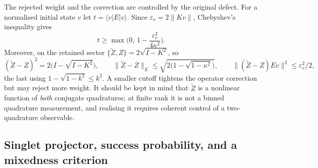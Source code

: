 \documentclass[11pt,a4paper]{article}
\newcommand{\ket}[1]{|#1\rangle}
\newcommand{\bra}[1]{\langle#1|}
\newcommand{\Zt}{\widetilde Z}
\begin{document}
The rejected weight and the correction are controlled by the original defect. For a normalised initial state $v$ let $t=\bra vE\ket v$. Since $\varepsilon_v=2\|Kv\|$, Chebyshev's inequality gives
\begin{equation}
t\ge\max\Big(0,\,1-\frac{\varepsilon_v^2}{4\kappa^2}\Big).
\label{eq:tbound}
\end{equation}
Moreover, on the retained sector $\{\Zt,Z\}=2\sqrt{I-K^2}$, so
\begin{equation}
(\Zt-Z)^2=2\big(I-\sqrt{I-K^2}\big),\qquad
\|\Zt-Z\|_{E}\le\sqrt{2\big(1-\sqrt{1-\kappa^2}\big)},\qquad
\|(\Zt-Z)Ev\|^2\le\varepsilon_v^2/2,
\label{eq:corrbound}
\end{equation}
the last using $1-\sqrt{1-k^2}\le k^2$. A smaller cutoff tightens the operator correction but may reject more weight. It should be kept in mind that $\Zt$ is a nonlinear function of \emph{both} conjugate quadratures; at finite rank it is not a binned quadrature measurement, and realising it requires coherent control of a two-quadrature observable.

\subsection{Singlet projector, success probability, and a mixedness criterion}
\label{sec:singlet}
\end{document}
